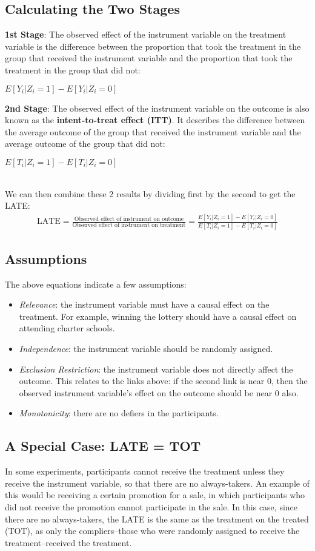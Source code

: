 \documentclass{article}
\begin{document}
\subsection{Calculating the Two Stages}
\textbf{1st Stage}: The observed effect of the instrument variable on the treatment variable is the difference between the proportion that took the treatment in the group that received the instrument variable and the proportion that took the treatment in the group that did not:
\\
\centerline{$E[Y_i|Z_i=1]-E[Y_i|Z_i=0]$}
\textbf{2nd Stage}: The observed effect of the instrument variable on the outcome is also known as the \textbf{intent-to-treat effect (ITT)}. 
It describes the difference between the average outcome of the group that received the instrument variable and the average outcome of the group that did not:
\\
\centerline{$E[T_i|Z_i=1]-E[T_i|Z_i=0]$}
\\
We can then combine these 2 results by dividing first by the second to get the LATE:
\begin{gather*}
\textrm{LATE} = \frac{\textrm{Observed effect of instrument on outcome}}{\textrm{Observed effect of instrument on treatment}} = \frac{E[Y_i|Z_i=1]-E[Y_i|Z_i=0]}{E[T_i|Z_i=1]-E[T_i|Z_i=0]}
\end{gather*} 


\subsection{Assumptions}
The above equations indicate a few assumptions:
\begin{itemize}
    \item \textit{Relevance}: the instrument variable must have a causal effect on the treatment. For example, winning the lottery should have a causal effect on attending charter schools.
    \item \textit{Independence}: the instrument variable should be randomly assigned.
    \item \textit{Exclusion Restriction}: the instrument variable does not directly affect the outcome. This relates to the links above: if the second link is near 0, then the observed instrument variable's effect on the outcome should be near 0 also.
    \item \textit{Monotonicity}: there are no defiers in the participants. 
\end{itemize}

\subsection{A Special Case: LATE = TOT}
In some experiments, participants cannot receive the treatment unless they receive the instrument variable, so that there are no always-takers. 
An example of this would be receiving a certain promotion for a sale, in which participants who did not receive the promotion cannot participate in the sale. 
In this case, since there are no always-takers, the LATE is the same as the treatment on the treated (TOT), as only the compliers–those who were randomly assigned to receive the treatment–received the treatment. 
\end{document}
